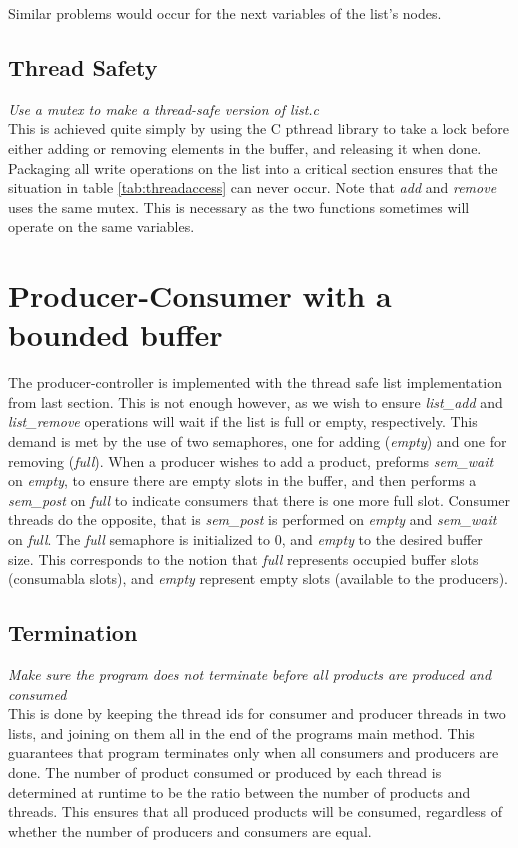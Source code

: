 \documentclass[a4paper, titlepage]{article}
\begin{document}
Similar problems would
occur for the next variables of the list's nodes.

\subsection{Thread Safety}
\textit{Use a mutex to make a thread-safe version of list.c}\\

This is achieved quite simply by using the C pthread library to take a lock
before either adding or removing elements in the buffer, and releasing it when
done. Packaging all write operations on the list into a critical section ensures
that the situation in table \ref{tab:threadaccess} can never occur. Note that
\emph{add} and \emph{remove} uses the same mutex. This is necessary as the two
functions sometimes will operate on the same variables.

\section{Producer-Consumer with a bounded buffer}
The producer-controller is implemented with the thread safe list implementation
from last section. This is not enough however, as we wish to ensure \emph{list\_add}
and \emph{list\_remove} operations will wait if the list is full or empty,
respectively. This demand is met by the use of two semaphores, one for adding
(\emph{empty}) and one for removing (\emph{full}). When a producer wishes to add
a product, preforms \emph{sem\_wait} on \emph{empty}, to ensure there are empty
slots in the buffer, and then performs a \emph{sem\_post} on \emph{full} to
indicate consumers that there is one more full slot. Consumer threads do the
opposite, that is \emph{sem\_post} is performed on \emph{empty} and
\emph{sem\_wait} on \emph{full}. The \emph{full} semaphore is initialized to 0,
and \emph{empty} to the desired buffer size. This corresponds to the notion that
\emph{full} represents occupied buffer slots (consumabla slots), and
\emph{empty} represent empty slots (available to the producers).

\subsection{Termination}
\textit{Make sure the program does not terminate before all products are
produced and consumed}\\

This is done by keeping the thread ids for consumer and producer threads in two
lists, and joining on them all in the end of the programs main method. This
guarantees that program terminates only when all consumers and producers are
done. The number of product consumed or produced by each thread is determined at
runtime to be the ratio between the number of products and threads. This ensures
that all produced products will be consumed, regardless of whether the number of
producers and consumers are equal.
\end{document}
